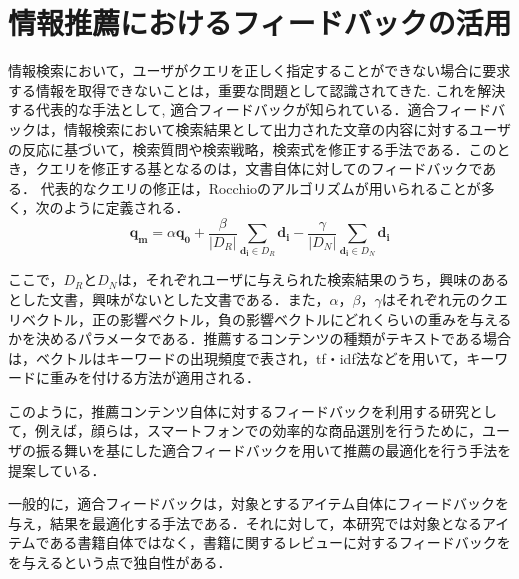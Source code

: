 \documentclass[a4paper,11pt,oneside,openany]{jsbook}
\begin{document}
	\section{情報推薦におけるフィードバックの活用}
\label{sec:related_feed}
情報検索において，ユーザがクエリを正しく指定することができない場合に要求する情報を取得できないことは，重要な問題として認識されてきた. これを解決する代表的な手法として, 適合フィードバックが知られている\cite{feedback}．適合フィードバックは，情報検索において検索結果として出力された文章の内容に対するユーザの反応に基づいて，検索質問や検索戦略，検索式を修正する手法である\cite{hijikata}．このとき，クエリを修正する基となるのは，文書自体に対してのフィードバックである．
代表的なクエリの修正は，Rocchioのアルゴリズムが用いられることが多く，次のように定義される．
\begin{equation}
\mathbf{q_m} = \alpha\mathbf{q_0}+\frac{\beta}{|D_R|}\sum_{\mathbf{d_i}\in{D_R}}{\mathbf{d_i}}-\frac{\gamma}{|D_N|}\sum_{\mathbf{d_i}\in{D_N}}{\mathbf{d_i}}
\end{equation}
\par
ここで，$D_R$と$D_N$は，それぞれユーザに与えられた検索結果のうち，興味のあるとした文書，興味がないとした文書である．また，$\alpha$，$\beta$，$\gamma$はそれぞれ元のクエリベクトル，正の影響ベクトル，負の影響ベクトルにどれくらいの重みを与えるかを決めるパラメータである．推薦するコンテンツの種類がテキストである場合は，ベクトルはキーワードの出現頻度で表され，tf・idf法などを用いて，キーワードに重みを付ける方法が適用される．
\par
このように，推薦コンテンツ自体に対するフィードバックを利用する研究として，例えば，顔らは，スマートフォンでの効率的な商品選別を行うために，ユーザの振る舞いを基にした適合フィードバックを用いて推薦の最適化を行う手法を提案している\cite{yan}．
\par
一般的に，適合フィードバックは，対象とするアイテム自体にフィードバックを与え，結果を最適化する手法である．それに対して，本研究では対象となるアイテムである書籍自体ではなく，書籍に関するレビューに対するフィードバックをを与えるという点で独自性がある．
\end{document}
